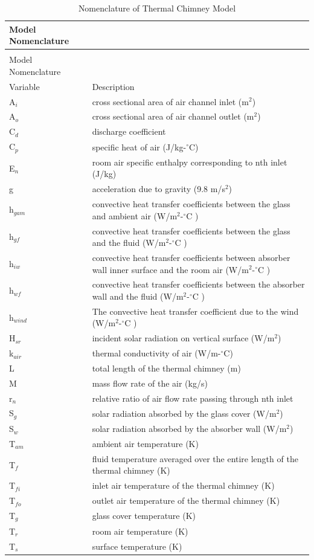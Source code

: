 \begin{longtable}[l]{p{1.5in}p{4.5in}}
\caption{Nomenclature of Thermal Chimney Model \label{table:nomenclature-of-thermal-chimney-model}} \tabularnewline
\toprule
Model Nomenclature \tabularnewline
\midrule
\endfirsthead

\caption[]{Nomenclature of Thermal Chimney Model} \tabularnewline
\toprule
Model Nomenclature \tabularnewline
\midrule
\endhead

Variable & Description \tabularnewline
A\(_{i}\) & cross sectional area of air channel inlet (m\(^{2}\)) \tabularnewline
A\(_{o}\) & cross sectional area of air channel outlet (m\(^{2}\)) \tabularnewline
C\(_{d}\) & discharge coefficient \tabularnewline
C\(_{p}\) & specific heat of air (J/kg-\(^{\circ}\)C) \tabularnewline
E\(_{n}\) & room air specific enthalpy corresponding to nth inlet (J/kg) \tabularnewline
g & acceleration due to gravity (9.8 m/s\(^{2}\)) \tabularnewline
h\(_{gam}\) & convective heat transfer coefficients between the glass and ambient air (W/m\(^{2}\)-\(^{\circ}\)C ) \tabularnewline
h\(_{gf}\) & convective heat transfer coefficients between the glass and the fluid (W/m\(^{2}\)-\(^{\circ}\)C ) \tabularnewline
h\(_{iw}\) & convective heat transfer coefficients between absorber wall inner surface and the room air (W/m\(^{2}\)-\(^{\circ}\)C ) \tabularnewline
h\(_{wf}\) & convective heat transfer coefficients between the absorber wall and the fluid (W/m\(^{2}\)-\(^{\circ}\)C ) \tabularnewline
h\(_{wind}\) & The convective heat transfer coefficient due to the wind (W/m\(^{2}\)-\(^{\circ}\)C ) \tabularnewline
H\(_{sr}\) & incident solar radiation on vertical surface (W/m\(^{2}\)) \tabularnewline
k\(_{air}\) & thermal conductivity of air (W/m-\(^{\circ}\)C) \tabularnewline
L & total length of the thermal chimney (m) \tabularnewline
M & mass flow rate of the air (kg/s) \tabularnewline
r\(_{n}\) & relative ratio of air flow rate passing through nth inlet \tabularnewline
S\(_{g}\) & solar radiation absorbed by the glass cover (W/m\(^{2}\)) \tabularnewline
S\(_{w}\) & solar radiation absorbed by the absorber wall (W/m\(^{2}\)) \tabularnewline
T\(_{am}\) & ambient air temperature (K) \tabularnewline
T\(_{f}\) & fluid temperature averaged over the entire length of the thermal chimney (K) \tabularnewline
T\(_{fi}\) & inlet air temperature of the thermal chimney (K) \tabularnewline
T\(_{fo}\) & outlet air temperature of the thermal chimney (K) \tabularnewline
T\(_{g}\) & glass cover temperature (K) \tabularnewline
T\(_{r}\) & room air temperature (K) \tabularnewline
T\(_{s}\) & surface temperature (K) \tabularnewline

\end{longtable}
